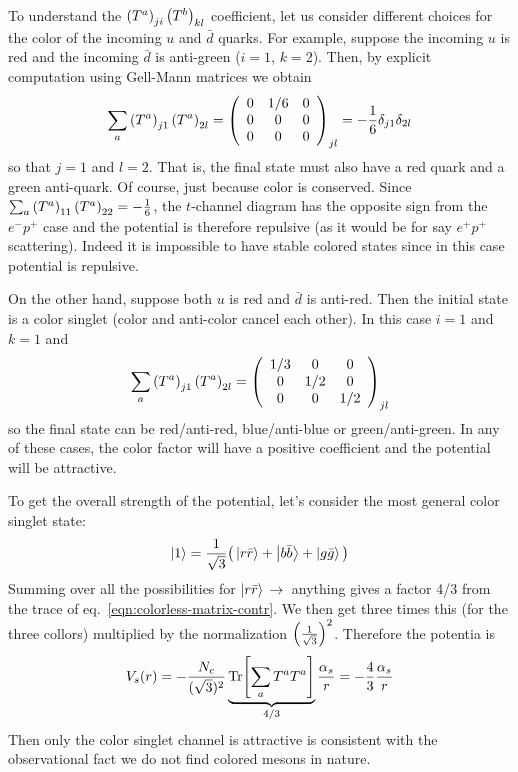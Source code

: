\documentclass[TheoreticalPhy_ModB.tex]{subfiles}
\begin{document}
To understand the $\left(T^a\right)_{ji}\left(T^b\right)_{kl}$ coefficient, let us consider different choices for the color of the incoming $u$ and $\bar d$ quarks. For example, suppose the incoming $u$ is red and the incoming $\bar d$ is anti-green ($i=1$, $k=2$). Then, by explicit computation using Gell-Mann matrices we obtain
\[\sum_a\left(T^a\right)_{j1}\left(T^a\right)_{2l}=\left(\begin{array}{ccc}0 & 1/6 & 0 \\0 & 0 & 0 \\0 & 0 & 0\end{array}\right)_{jl}=-\frac16\delta_{j1}\delta_{2l}\]
so that $j=1$ and $l=2$. That is, the final state must also have a red quark and a green anti-quark. Of course, just because color is conserved. Since $\sum_a\left(T^a\right)_{11}\left(T^a\right)_{22}=-\frac16$, the $t$-channel diagram has the opposite sign from the $e^-p^+$ case and the potential is therefore repulsive (as it would be for say $e^+p^+$ scattering). Indeed it is impossible to have stable colored states since in this case potential is repulsive.

On the other hand, suppose both $u$ is red and $\bar d$ is anti-red. Then the initial state is a color singlet (color and anti-color cancel each other). In this case $i=1$ and $k=1$ and 
\begin{equation}\label{eqn:colorless-matrix-contr}
\sum_a\left(T^a\right)_{j1}\left(T^a\right)_{2l}=\left(\begin{array}{ccc}1/3 & 0 & 0 \\0 & 1/2 & 0 \\0 & 0 & 1/2\end{array}\right)_{jl}
\end{equation}
so the final state can be red/anti-red, blue/anti-blue or green/anti-green. In any of these cases, the color factor will have a positive coefficient and the potential will be attractive. 

To get the overall strength of the potential, let's consider the most general color singlet state:
\[\ket1=\frac{1}{\sqrt3}\big(\ket{r\bar r}+\ket{b\bar b}+\ket{g\bar g}\big)\]
Summing over all the possibilities for $\ket{r\bar r}\,\rightarrow\,$ anything gives a factor 4/3 from the trace of eq.~\eqref{eqn:colorless-matrix-contr}. We then get three times this (for the three collors) multiplied by the normalization $\left(\frac1{\sqrt3}\right)^2$. Therefore the potentia is
\[V_s(r)=-\frac{N_c}{(\sqrt 3)^2}\underbrace{\Tr[\sum_aT^aT^a]}_{4/3}\frac{\alpha_s}r=-\frac43\frac{\alpha_s}r\]
Then only the color singlet channel is attractive is consistent with the observational fact we do not find colored mesons in nature. 
\end{document}
